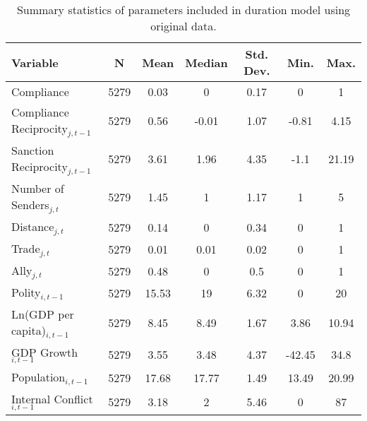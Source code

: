 \begin{table}[ht]
\centering
{\normalsize
\begin{tabular}{lcccccc}
 Variable & N & Mean & Median & Std. Dev. & Min. & Max. \\ 
  \hline
\hline
Compliance & 5279 & 0.03 & 0 & 0.17 & 0 & 1 \\ 
  Compliance Reciprocity$_{j,t-1}$ & 5279 & 0.56 & -0.01 & 1.07 & -0.81 & 4.15 \\ 
  Sanction Reciprocity$_{j,t-1}$ & 5279 & 3.61 & 1.96 & 4.35 & -1.1 & 21.19 \\ 
  Number of Senders$_{j,t}$ & 5279 & 1.45 & 1 & 1.17 & 1 & 5 \\ 
  Distance$_{j,t}$ & 5279 & 0.14 & 0 & 0.34 & 0 & 1 \\ 
  Trade$_{j,t}$ & 5279 & 0.01 & 0.01 & 0.02 & 0 & 1 \\ 
  Ally$_{j,t}$ & 5279 & 0.48 & 0 & 0.5 & 0 & 1 \\ 
  Polity$_{i,t-1}$ & 5279 & 15.53 & 19 & 6.32 & 0 & 20 \\ 
  Ln(GDP per capita)$_{i,t-1}$ & 5279 & 8.45 & 8.49 & 1.67 & 3.86 & 10.94 \\ 
  GDP Growth$_{i,t-1}$ & 5279 & 3.55 & 3.48 & 4.37 & -42.45 & 34.8 \\ 
  Population$_{i,t-1}$ & 5279 & 17.68 & 17.77 & 1.49 & 13.49 & 20.99 \\ 
  Internal Conflict$_{i,t-1}$ & 5279 & 3.18 & 2 & 5.46 & 0 & 87 \\ 
   \hline
\hline
\end{tabular}
}
\caption{Summary statistics of parameters included in duration model using original data.} 
\label{tab:summNoImp}
\end{table}
